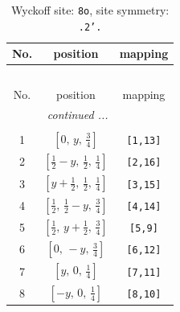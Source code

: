 \documentclass[fleqn,8pt]{jsarticle}
\begin{document}
\begin{longtable}{ccc}
\caption{Wyckoff site: {\tt 8o}, site symmetry: {\tt .2'.}}
 \\
 \hline \hline
No. & position & mapping \\ \hline \endfirsthead

\multicolumn{2}{l}{\tablename\ \thetable{}} \\
 \hline \hline
No. & position & mapping \\ \hline \endhead

 \hline \hline
\multicolumn{2}{r}{\footnotesize\it continued ...} \\ \endfoot

 \hline \hline
\multicolumn{2}{r}{} \\ \endlastfoot

1 & $\left[ 0,\, y,\, \frac{3}{4} \right]$ & {\tt [1,13]} \\ \hline
2 & $\left[ \frac{1}{2} - y,\, \frac{1}{2},\, \frac{1}{4} \right]$ & {\tt [2,16]} \\ \hline
3 & $\left[ y + \frac{1}{2},\, \frac{1}{2},\, \frac{1}{4} \right]$ & {\tt [3,15]} \\ \hline
4 & $\left[ \frac{1}{2},\, \frac{1}{2} - y,\, \frac{3}{4} \right]$ & {\tt [4,14]} \\ \hline
5 & $\left[ \frac{1}{2},\, y + \frac{1}{2},\, \frac{3}{4} \right]$ & {\tt [5,9]} \\ \hline
6 & $\left[ 0,\, - y,\, \frac{3}{4} \right]$ & {\tt [6,12]} \\ \hline
7 & $\left[ y,\, 0,\, \frac{1}{4} \right]$ & {\tt [7,11]} \\ \hline
8 & $\left[ - y,\, 0,\, \frac{1}{4} \right]$ & {\tt [8,10]} \\
\end{longtable}
\renewcommand{\arraystretch}{1.2}
\end{document}
